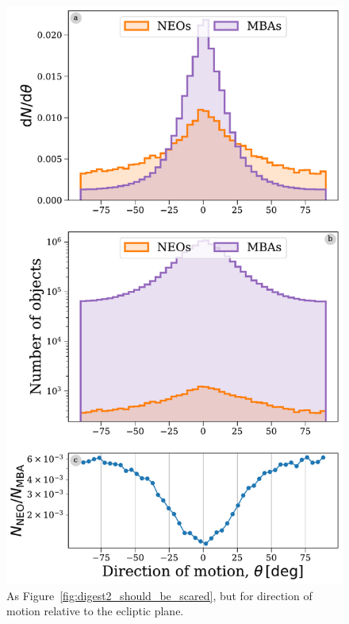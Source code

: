 \documentclass[preprint2, twocolappendix]{aastex631}
\begin{document}
\begin{figure}[htb]
    \centering
    \includegraphics[width=\columnwidth]{figures/direction_dist_all.pdf}
    \caption{As Figure~\ref{fig:digest2_should_be_scared}, but for direction of motion relative to the ecliptic plane.}
    \label{fig:dir_all}
\end{figure}
\end{document}
